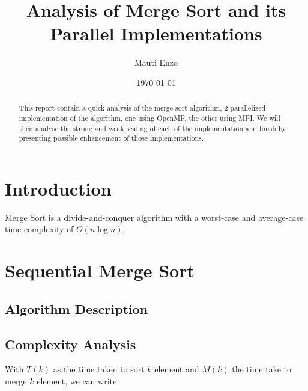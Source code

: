 \documentclass[12pt]{article}
\title{Analysis of Merge Sort and its Parallel Implementations}
\author{Mauti Enzo}
\date{\today}
\begin{document}
\maketitle

\begin{abstract}
This report contain a quick analysis of the merge sort algorithm, 2 parallelized implementation of the algorithm, one using OpenMP, the other using MPI.
We will then analyse the strong and weak scaling of each of the implementation and finish by presenting possible enhancement of those implementations.
\end{abstract}

\section{Introduction}
Merge Sort is a divide-and-conquer algorithm with a worst-case and average-case time complexity of \( O(n \log n) \).

\section{Sequential Merge Sort}

\subsection{Algorithm Description}
\noindent{}


\subsection{Complexity Analysis}
With \(T(k)\) as the time taken to sort \(k\) element and \(M(k)\) the time take to merge \(k\) element, we can write:
\end{document}
